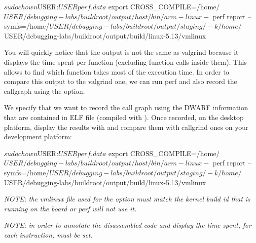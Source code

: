 \begin{bashinput}
$ sudo chown $USER:$USER perf.data
$ export CROSS_COMPILE=/home/$USER/debugging-labs/buildroot/output/host/bin/arm-linux-
$ perf report --symfs=/home/$USER/debugging-labs/buildroot/output/staging/
    -k /home/$USER/debugging-labs/buildroot/output/build/linux-5.13/vmlinux
\end{bashinput}

You will quickly notice that the output is not the same as valgrind because it
displays the time spent per function (excluding function calls inside them).
This allows to find which function takes most of the execution time. In order to
compare this output to the valgrind one, we can run perf and also record the
callgraph using the  option.


We specify that we want to record the call graph using the DWARF information
that are contained in ELF file (compiled with ). Once recorded, on the
desktop platform, display the results with  and compare them
with callgrind ones on your development platform:

\begin{bashinput}
$ sudo chown $USER:$USER perf.data
$ export CROSS_COMPILE=/home/$USER/debugging-labs/buildroot/output/host/bin/arm-linux-
$ perf report --symfs=/home/$USER/debugging-labs/buildroot/output/staging/
   -k /home/$USER/debugging-labs/buildroot/output/build/linux-5.13/vmlinux
\end{bashinput}

{\em NOTE: the vmlinux file used for the  option must match the kernel
build id that is running on the board or perf will not use it.}

{\em NOTE: in order to annotate the disassembled code and display the time spent,
for each instruction,  must be set.}
